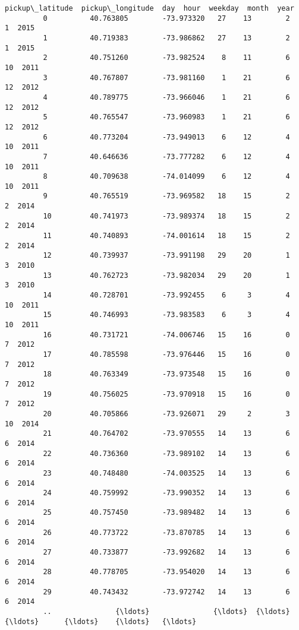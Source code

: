 \documentclass[11pt]{article}
\begin{document}
\begin{Verbatim}[commandchars=\\\{\}]
              pickup\_latitude  pickup\_longitude  day  hour  weekday  month  year  
         0          40.763805        -73.973320   27    13        2      1  2015  
         1          40.719383        -73.986862   27    13        2      1  2015  
         2          40.751260        -73.982524    8    11        6     10  2011  
         3          40.767807        -73.981160    1    21        6     12  2012  
         4          40.789775        -73.966046    1    21        6     12  2012  
         5          40.765547        -73.960983    1    21        6     12  2012  
         6          40.773204        -73.949013    6    12        4     10  2011  
         7          40.646636        -73.777282    6    12        4     10  2011  
         8          40.709638        -74.014099    6    12        4     10  2011  
         9          40.765519        -73.969582   18    15        2      2  2014  
         10         40.741973        -73.989374   18    15        2      2  2014  
         11         40.740893        -74.001614   18    15        2      2  2014  
         12         40.739937        -73.991198   29    20        1      3  2010  
         13         40.762723        -73.982034   29    20        1      3  2010  
         14         40.728701        -73.992455    6     3        4     10  2011  
         15         40.746993        -73.983583    6     3        4     10  2011  
         16         40.731721        -74.006746   15    16        0      7  2012  
         17         40.785598        -73.976446   15    16        0      7  2012  
         18         40.763349        -73.973548   15    16        0      7  2012  
         19         40.756025        -73.970918   15    16        0      7  2012  
         20         40.705866        -73.926071   29     2        3     10  2014  
         21         40.764702        -73.970555   14    13        6      6  2014  
         22         40.736360        -73.989102   14    13        6      6  2014  
         23         40.748480        -74.003525   14    13        6      6  2014  
         24         40.759992        -73.990352   14    13        6      6  2014  
         25         40.757450        -73.989482   14    13        6      6  2014  
         26         40.773722        -73.870785   14    13        6      6  2014  
         27         40.733877        -73.992682   14    13        6      6  2014  
         28         40.778705        -73.954020   14    13        6      6  2014  
         29         40.743432        -73.972742   14    13        6      6  2014  
         ..               {\ldots}               {\ldots}  {\ldots}   {\ldots}      {\ldots}    {\ldots}   {\ldots}  

\end{Verbatim}
\end{document}

